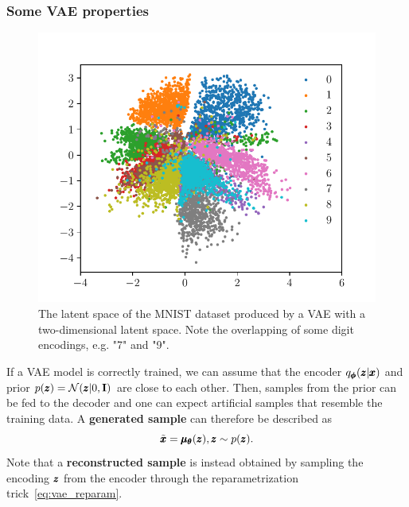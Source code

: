 \subsubsection{Some VAE properties}
\begin{figure}
\begin{centering}
\includegraphics[scale=0.8]{data/chapter_survey/mnist_latent}
\par\end{centering}
\caption{The latent space of the MNIST dataset produced by a VAE with a two-dimensional latent space. Note the overlapping of some digit encodings, e.g. "7" and "9".}
\label{fig:mnist_latent}
\end{figure}

If a VAE model is correctly trained, we can assume that the encoder $q_{\pmb{{\phi}}}(\pmb{{z}}|\pmb{{x}})$ and prior $p(\pmb{{z}})=\mathcal{N}(\pmb{{z}}|0,\textbf{I})$ are close to each other. Then, samples from the prior can be fed to the decoder and one can expect artificial samples that resemble the training data. A \textbf{generated sample} can therefore be described as
\begin{equation} \label{eq:generated_sample}
    \tilde{\pmb{{x}}} = \pmb{{\mu}}_{\pmb{{\theta}}}(\pmb{{z}}), \pmb{{z}} \sim p(\pmb{{z}}).
\end{equation}
Note that a \textbf{reconstructed sample} is instead obtained by sampling the encoding $\pmb{{z}}$ from the encoder through the reparametrization trick~\eqref{eq:vae_reparam}. 

